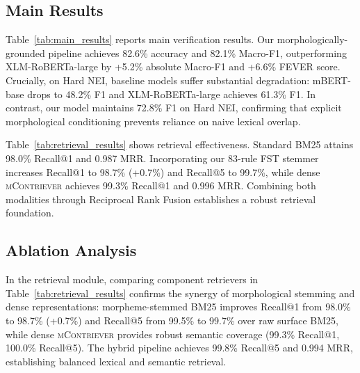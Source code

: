 \begin{table}[t]
\centering
\small
\caption{Fact verification performance on the Kazakh-FEVER 3K test suite. Best results in bold.}
\label{tab:main_results}
\end{table}

\subsection{Main Results}
Table~\ref{tab:main_results} reports main verification results. Our morphologically-grounded pipeline achieves 82.6\% accuracy and 82.1\% Macro-F1, outperforming XLM-RoBERTa-large by +5.2\% absolute Macro-F1 and +6.6\% FEVER score. Crucially, on Hard NEI, baseline models suffer substantial degradation: mBERT-base drops to 48.2\% F1 and XLM-RoBERTa-large achieves 61.3\% F1. In contrast, our model maintains 72.8\% F1 on Hard NEI, confirming that explicit morphological conditioning prevents reliance on naive lexical overlap.

Table~\ref{tab:retrieval_results} shows retrieval effectiveness. Standard BM25 attains 98.0\% Recall@1 and 0.987 MRR. Incorporating our 83-rule FST stemmer increases Recall@1 to 98.7\% (+0.7\%) and Recall@5 to 99.7\%, while dense \textsc{mContriever} achieves 99.3\% Recall@1 and 0.996 MRR. Combining both modalities through Reciprocal Rank Fusion establishes a robust retrieval foundation.

\subsection{Ablation Analysis}
\label{sec:ablation}
In the retrieval module, comparing component retrievers in Table~\ref{tab:retrieval_results} confirms the synergy of morphological stemming and dense representations: morpheme-stemmed BM25 improves Recall@1 from 98.0\% to 98.7\% (+0.7\%) and Recall@5 from 99.5\% to 99.7\% over raw surface BM25, while dense \textsc{mContriever} provides robust semantic coverage (99.3\% Recall@1, 100.0\% Recall@5). The hybrid pipeline achieves 99.8\% Recall@5 and 0.994 MRR, establishing balanced lexical and semantic retrieval.

